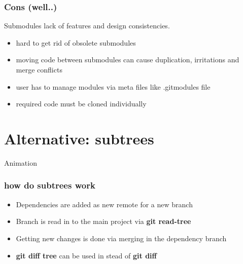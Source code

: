 \documentclass[10pt]{beamer}
\begin{document}
\begin{frame}
	\frametitle{Cons (well..)}
	Submodules lack of features and design consistencies.
	\begin{itemize}
		\item hard to get rid of obsolete submodules
		\item moving code between submodules can cause duplication, irritations and merge conflicts
		\item user has to manage modules via meta files like .gitmodules file
		\item required code must be cloned individually
	\end{itemize}
\end{frame}
   
\section{Alternative: subtrees}
\begin{frame}{Animation}
\frametitle{how do subtrees work}
	\begin{itemize}[<+- | alert@+>]
		\item Dependencies are added as new remote for a new branch
		\item Branch is read in to the main project via \textbf{git read-tree}
		\item Getting new changes is done via merging in the dependency branch
		\item \textbf{git diff tree} can be used in stead of \textbf{git diff}
	\end{itemize}

\end{frame}	
\end{document}
